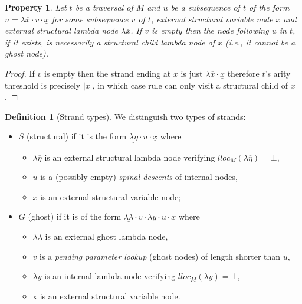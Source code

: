 \documentclass{elsarticle}
\makeatletter
\theoremstyle{plain}
\newtheorem{property}[theorem]{Property}
\theoremstyle{definition}
\newtheorem{definition}{Definition}[section]
\theoremstyle{remark}
\newcommand{\ghostlmd}{{\lambda\!\!\lambda}}
\renewcommand\ie{{\it i.e.\@\xspace}}
\makeatother
\begin{document}
\begin{property}
\label{prop:strand_spinaldescent}
Let $t$ be a traversal of $M$ and $u$ be a subsequence of $t$ of the form
$u = \underline{\lambda \overline{x}} \cdot v \cdot \underline{x}$
for some subsequence $v$ of $t$, external structural variable node $x$ and external structural lambda node $\lambda \overline{x}$.
If $v$ is empty then the node following $u$ in $t$, if it exists, is necessarily a structural child lambda node of $x$ (\ie, it cannot be a ghost node).
\end{property}
\begin{proof}
 If $v$ is empty then the strand ending at $x$
 is just $\underline{\lambda \overline{x}} \cdot \underline{x}$ therefore
 $t$'s arity threshold is precisely $|x|$, in which case rule  can only visit a structural child of $x$.
\end{proof}

\begin{definition}[Strand types]
    \label{def:strandtypes} We distinguish two types of strands:
    \begin{itemize}[nosep]
        \item $S$ (structural) if it is the form $\underline{\lambda\overline{\eta}} \cdot u \cdot \underline{x}$
            where
            \begin{itemize}[nosep]
            \item $\lambda\overline{\eta}$ is an external structural lambda node verifying $lloc_M(\lambda\overline\eta) = \bot$,
            \item $u$ is a (possibly empty) \emph{spinal descents} of internal nodes,
            \item $x$ is an external structural variable node;
            \end{itemize}

        \item $G$ (ghost) if it is of the form $\underline{\ghostlmd} \cdot  v \cdot \lambda\overline{y} \cdot u \cdot \underline{x}$
        where
        \begin{itemize}[nosep]
            \item $\ghostlmd$ is an external ghost lambda node,
            \item $v$ is a \emph{pending parameter lookup} (ghost nodes) of length shorter than $u$,
            \item $\lambda\overline{y}$ is an internal lambda node verifying $lloc_M(\lambda\overline{y}) = \bot$,
            \item x is an external structural variable node.
        \end{itemize}
    \end{itemize}
\end{definition}
\end{document}
